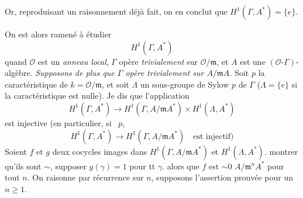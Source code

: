 \documentclass[11pt,a4paper]{article}
\begin{document}

Or, reproduisant un raisonnement déjà fait, on en conclut que
$H^1(\Gamma, A^{*}) = \lbrace e \rbrace$.

On est alors ramené à étudier
\[
  H^1(\Gamma, A^{*})
\]
quand $\mathcal{O}$ est un \emph{anneau local}, $\Gamma$ opère
\emph{trivialement} sur $\mathcal{O}/\mathfrak{m}$, et $A$ est une
$(\mathcal{O}\text{-}\Gamma)$-algèbre. \emph{Supposons de plus que $\Gamma$
opère trivialement sur $A/\mathfrak{m}A$.}
Soit $p$ la caractéristique de $k = \mathcal{O}/\mathfrak{m}$, et soit
$\Lambda$  un sous-groupe de Sylow  $p$ de $\Gamma$
($\Lambda = \lbrace e \rbrace$ si la caractéristique est nulle).
Je dis que l'application
\[
  H^1(\Gamma, A^{*}) \longrightarrow H^1(\Gamma, A/\mathfrak{m}A^{*})
  \times H^1(\Lambda, A^{*})
\]
 est injective (en particulier, si
\ $p$, 
\[
  H^1(\Gamma, A^{*}) \longrightarrow H^1(\Gamma, A/\mathfrak{m}A^{*})
  \quad\text{est injectif)}
\]
Soient $f$ et $g$  deux cocycles  images dans
$H^1(\Gamma, A/\mathfrak{m}A^{*})$ et $H^1(\Lambda, A^{*})$.
 montrer qu'ils sont $\sim$,  \ill{} supposer
 $g(\gamma) = 1$ pour tt $\gamma$.  
alors \struck{\ill{}} que $f$ est $\sim 0$  \struck{\ill{}}
$A/\mathfrak{m}^{n}A^{*}$ pour tout $n$. On raisonne par récurrence sur $n$,
supposons l'assertion prouvée pour un $n \geq 1$.

\end{document}
